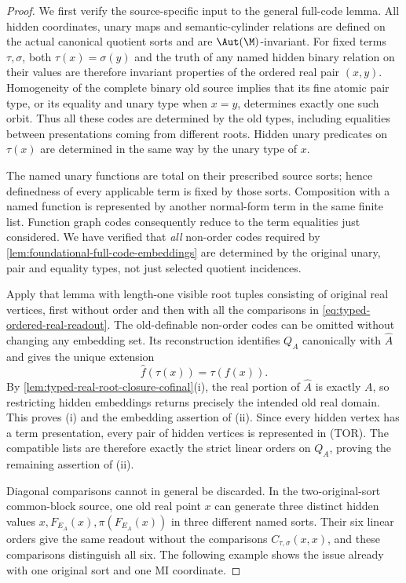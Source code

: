 \begin{proof}
We first verify the source-specific input to the general
full-code lemma. All hidden coordinates, unary maps and
semantic-cylinder relations are defined on the actual
canonical quotient sorts and are $\Aut(\M)$-invariant.
For fixed terms $\tau,\sigma$, both
\(\tau(x)=\sigma(y)\) and the truth of any named hidden
binary relation on their values are therefore invariant
properties of the ordered real pair $(x,y)$. Homogeneity of
the complete binary old source implies that its fine atomic
pair type, or its equality and unary type when $x=y$,
determines exactly one such orbit. Thus all these codes are
determined by the old types, including equalities between
presentations coming from different roots. Hidden unary
predicates on $\tau(x)$ are determined in the same way by
the unary type of $x$.

The named unary functions are total on their prescribed
source sorts; hence definedness of every applicable term is
fixed by those sorts. Composition with a named function is
represented by another normal-form term in the same finite
list. Function graph codes consequently reduce to the term
equalities just considered. We have verified that \emph{all}
non-order codes required by
\cref{lem:foundational-full-code-embeddings} are determined
by the original unary, pair and equality types, not just
selected quotient incidences.

Apply that lemma with length-one visible root tuples consisting
of original real vertices, first without order and then with
all the comparisons in \eqref{eq:typed-ordered-real-readout}.
The old-definable non-order codes can be omitted without
changing any embedding set. Its reconstruction identifies
$Q_A$ canonically with $\widehat A$ and gives the unique extension
\[
                      \widehat f(\tau(x))=\tau(f(x)).
\]
By \cref{lem:typed-real-root-closure-cofinal}(i), the real
portion of $\widehat A$ is exactly $A$, so restricting hidden
embeddings returns precisely the intended old real domain.
This proves (i) and the embedding assertion of (ii). Since
every hidden vertex has a term presentation, every pair of
hidden vertices is represented in (TOR). The compatible lists
are therefore exactly the strict linear orders on $Q_A$,
proving the remaining assertion of (ii).

Diagonal comparisons cannot in general be discarded. In the
two-original-sort common-block source, one old real point $x$
can generate three distinct hidden values
$x,F_{E_A}(x),\pi(F_{E_A}(x))$ in three different named sorts.
Their six linear orders give the same readout without the
comparisons $C_{\tau,\sigma}(x,x)$, and these comparisons
distinguish all six. The following example shows the issue
already with one original sort and one MI coordinate.


\end{proof}
